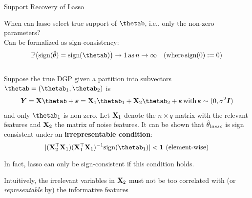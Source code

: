 \documentclass[11pt,compress,t,notes=noshow, xcolor=table]{beamer}
\begin{document}


\begin{vbframe}{Support Recovery of Lasso }
\begin{small}
When can lasso select true support of $\thetab$, i.e., only the non-zero parameters? \\
Can be formalized as sign-consistency: 
\begin{align*}
\mathbb{P}\big(\text{sign}(\thetah)=\text{sign}(\thetab)\big) \to 1 \, \text{as} \, n \to \infty \quad (\text{where}\,\text{sign}(0):=0) 
\end{align*}
\\
Suppose the true DGP given a partition into subvectors $\thetab=(\thetab_1, \thetab_2)$ is 
\begin{align*}
    \bm{Y}=\Xmat\thetab + \bm{\varepsilon} = \Xmat_1 \thetab_1 + \Xmat_2 \thetab_2 + \bm{\varepsilon}\,\text{with}\,\bm{\varepsilon}\sim (0,\sigma^2 \id)
\end{align*}
and only $\thetab_1$ is non-zero.
\vspace{0.1cm}
Let $\mathbf{X}_1$ denote the $n \times q$ matrix with the relevant features and $\mathbf{X}_2$ the matrix of noise features. It can be shown that $\hat{\theta}_{lasso}$ is sign consistent under an \textbf{irrepresentable condition}:
\begin{align*}
    \vert (\Xmat_2^{\top} \Xmat_1)(\Xmat_1^{\top} \Xmat_1)^{-1} \text{sign}(\thetab_1)\vert < \bm{1} \,\, (\text{element-wise})
\end{align*}

In fact, lasso can only be sign-consistent if this condition holds.

Intuitively, the irrelevant variables in $\mathbf{X}_2$ must not be too correlated with (or \textit{representable} by) the informative features 
\end{small}
\end{vbframe}

\endlecture
\end{document}
